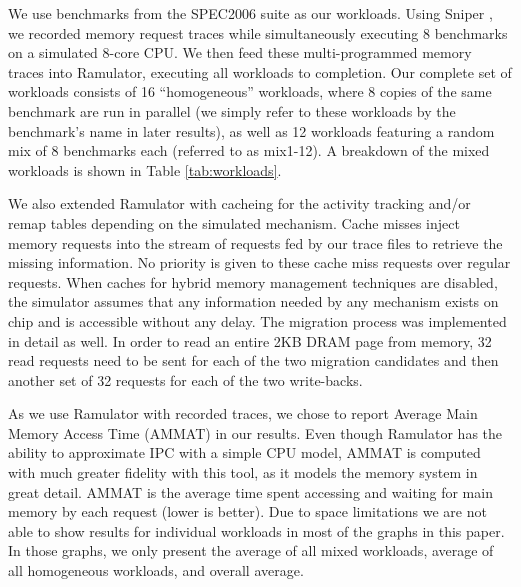 We use benchmarks from the SPEC2006 suite \cite{spec} as our workloads. Using Sniper \cite{sniper}, we recorded memory request traces while simultaneously executing 8 benchmarks on a simulated 8-core CPU. We then feed these multi-programmed memory traces into Ramulator, executing all workloads to completion. Our complete set of workloads consists of 16 ``homogeneous'' workloads, where 8 copies of the same benchmark are run in parallel (we simply refer to these workloads by the benchmark's name in later results), as well as 12 workloads featuring a random mix of 8 benchmarks each (referred to as mix1-12). A breakdown of the mixed workloads is shown in Table \ref{tab:workloads}.


We also extended Ramulator with cacheing for the activity tracking and/or remap tables depending on the simulated mechanism. Cache misses inject memory requests into the stream of requests fed by our trace files to retrieve the missing information. No priority is given to these cache miss requests over regular requests. When caches for hybrid memory management techniques are disabled, the simulator assumes that any information needed by any mechanism exists on chip and is accessible without any delay. The migration process was implemented in detail as well. In order to read an entire 2KB DRAM page from memory, 32 read requests need to be sent for each of the two migration candidates and then another set of 32 requests for each of the two write-backs.

As we use Ramulator with recorded traces, we chose to report Average Main Memory Access Time (AMMAT) in our results. Even though Ramulator has the ability to approximate IPC with a simple CPU model, 
AMMAT is computed with much greater fidelity with this tool,
as it models the memory system in great detail. AMMAT is the average time 
spent accessing and waiting for main memory by each request (lower is better). Due to space limitations we are not able to show results for individual workloads in most of the graphs in this paper. In those graphs, we only present the average of all mixed workloads, average of all homogeneous workloads, and overall average.

